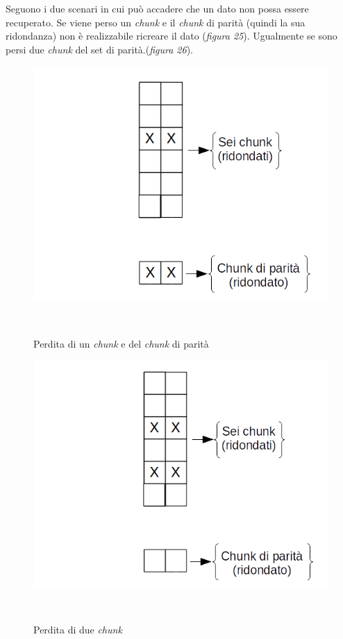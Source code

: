 Seguono i due scenari in cui pu\`{o} accadere che un dato non possa essere recuperato.
Se viene perso un \textit{chunk} e il \textit{chunk} di parit\`{a} (quindi la sua ridondanza) non \`{e} realizzabile ricreare il dato (\textit{figura 25}). Ugualmente se sono persi due \textit{chunk} del set di parit\`{a}.(\textit{figura 26}).
\begin{figure}[htbp]
\centering
\includegraphics[scale=0.55]{img/chunk2.png}\\
\caption{Perdita di un \textit{chunk} e del \textit{chunk} di parit\`{a} \label{figura1.22}}\\
\end{figure}

\begin{figure}[htbp]
\centering
\includegraphics[scale=0.55]{img/chunk3.png}\\
\caption{Perdita di due \textit{chunk} \label{figura1.23}}\\
\end{figure}

